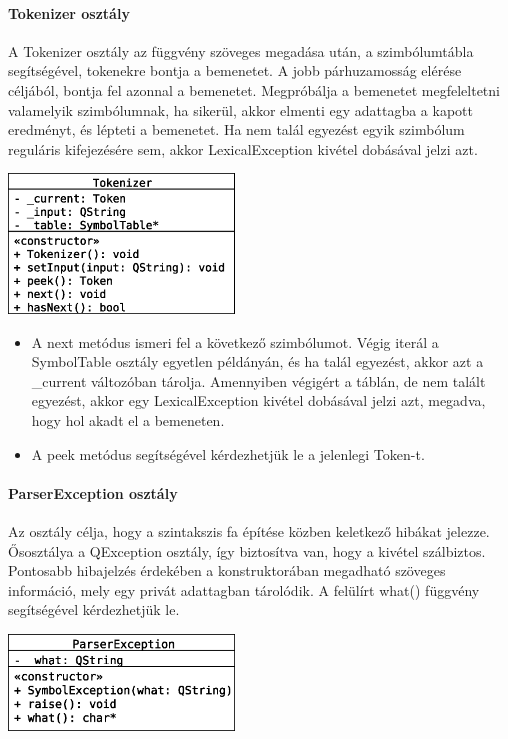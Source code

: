 \documentclass[12pt]{report}
\begin{document}
\paragraph{Tokenizer osztály}
A Tokenizer osztály az függvény szöveges megadása után, a szimbólumtábla segítségével, tokenekre bontja a bemenetet. A jobb párhuzamosság elérése céljából, bontja fel azonnal a bemenetet. Megpróbálja a bemenetet megfeleltetni valamelyik szimbólumnak, ha sikerül, akkor elmenti egy adattagba a kapott eredményt, és lépteti a bemenetet. Ha nem talál egyezést egyik szimbólum reguláris kifejezésére sem, akkor LexicalException kivétel dobásával jelzi azt.
\begin{center}
\includegraphics[width=6cm]{pics/uml/Tokenizer}
\end{center}
\begin{itemize}
\item A next metódus ismeri fel a következő szimbólumot. Végig iterál a SymbolTable osztály egyetlen példányán, és ha talál egyezést, akkor azt a \_current változóban tárolja. Amennyiben végigért a táblán, de nem talált egyezést, akkor egy LexicalException kivétel dobásával jelzi azt, megadva, hogy hol akadt el a bemeneten.
\item A peek metódus segítségével kérdezhetjük le a jelenlegi Token-t.
\end{itemize}

\paragraph{ParserException osztály}
Az osztály célja, hogy a szintakszis fa építése közben keletkező hibákat jelezze. Ősosztálya a QException osztály, így biztosítva van, hogy a kivétel szálbiztos. Pontosabb hibajelzés érdekében a konstruktorában megadható szöveges információ, mely egy privát adattagban tárolódik. A felülírt what() függvény segítségével kérdezhetjük le.
\begin{center}
\includegraphics[width=6cm]{pics/uml/ParserException}
\end{center}
\end{document}
